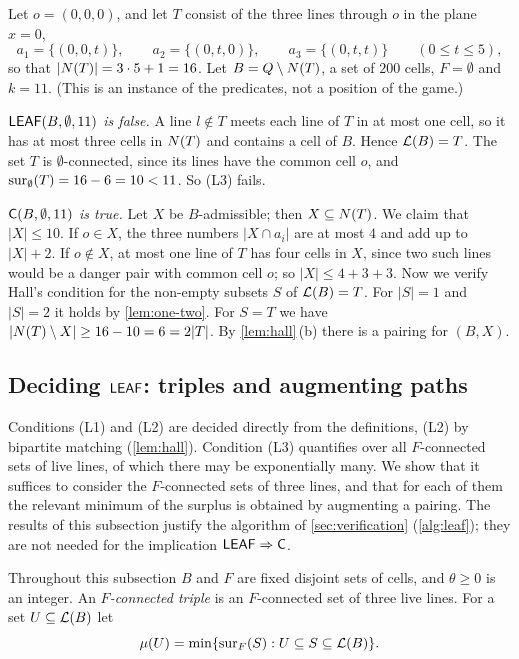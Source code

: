 \begin{example}\label{ex:C-not-leaf}
Let $o=(0,0,0)$, and let $T$ consist of the three lines through $o$ in the plane $x=0$,
\[
  a_1=\{(0,0,t)\},\qquad a_2=\{(0,t,0)\},\qquad a_3=\{(0,t,t)\}\qquad(0\le t\le 5),
\]
so that $|N(T)|=3\cdot 5+1=16$. Let $B=Q\setminus N(T)$, a set of $200$ cells, $F=\emptyset$ and $k=11$.
(This is an instance of the predicates, not a position of the game.)

\emph{$\mathsf{LEAF}(B,\emptyset,11)$ is false.} A line $l\notin T$ meets each line of $T$ in at most one cell, so
it has at most three cells in $N(T)$ and contains a cell of $B$. Hence $\mathcal{L}(B)=T$. The set $T$ is
$\emptyset$-connected, since its lines have the common cell $o$, and $\operatorname{sur}_\emptyset(T)=16-6=10<11$. So
(L3) fails.

\emph{$\mathsf{C}(B,\emptyset,11)$ is true.} Let $X$ be $B$-admissible; then $X\subseteq N(T)$. We claim that
$|X|\le 10$. If $o\in X$, the three numbers $|X\cap a_i|$ are at most $4$ and add up to $|X|+2$. If
$o\notin X$, at most one line of $T$ has four cells in $X$, since two such lines would be a danger pair
with common cell $o$; so $|X|\le 4+3+3$. Now we verify Hall's condition for the non-empty subsets $S$ of
$\mathcal{L}(B)=T$. For $|S|=1$ and $|S|=2$ it holds by \cref{lem:one-two}. For $S=T$ we have
$|N(T)\setminus X|\ge 16-10=6=2|T|$. By \cref{lem:hall}\,(b) there is a pairing for $(B,X)$.
\end{example}

\subsection{Deciding \texorpdfstring{$\mathsf{LEAF}$}{LEAF}: triples and augmenting paths}\label{ssec:deciding}

Conditions (L1) and (L2) are decided directly from the definitions, (L2) by bipartite matching
(\cref{lem:hall}). Condition (L3) quantifies over all $F$-connected sets of live lines, of which there
may be exponentially many. We show that it suffices to consider the $F$-connected sets of three lines,
and that for each of them the relevant minimum of the surplus is obtained by augmenting a pairing. The
results of this subsection justify the algorithm of \cref{sec:verification} (\cref{alg:leaf}); they are
not needed for the implication $\mathsf{LEAF}\Rightarrow\mathsf{C}$.

Throughout this subsection $B$ and $F$ are fixed disjoint sets of cells, and $\theta\ge 0$ is an integer.
An \emph{$F$-connected triple} is an $F$-connected set of three live lines. For a set $U\subseteq\mathcal{L}(B)$
let
\[
  \mu(U)=\min\{\operatorname{sur}_F(S) : U\subseteq S\subseteq\mathcal{L}(B)\}.
\]


